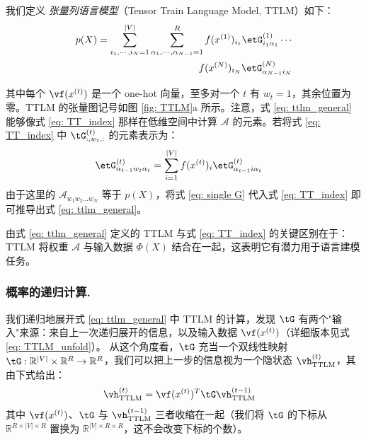 我们定义 \textit{张量列语言模型}（Tensor Train Language Model, TTLM）如下：
\begin{equation}
\begin{split}
    p(X) = \sum_{i_1, \cdots, i_N = 1}^{|V|} \sum_{\alpha_1, \cdots, \alpha_{N-1} = 1}^R f(x^{(1)})_{i_1}\etG^{(1)}_{i_1\alpha_1} \cdots \\ f(x^{(N)})_{i_N}\etG^{(N)}_{\alpha_{N-1}i_N}  \label{eq: ttlm_general}
\end{split}
\end{equation}

其中每个 $\vf(x^{(t)})$ 是一个 one-hot 向量，至多对一个 $t$ 有 $w_t = 1$，其余位置为零。TTLM 的张量图记号如图 \ref{fig: TTLM}a 所示。注意，式 \ref{eq: ttlm_general} 能够像式 \ref{eq: TT_index} 那样在低维空间中计算 $\mathcal{A}$ 的元素。若将式 \ref{eq: TT_index} 中 $\tG^{(t)}_{:, w_t, :}$ 的元素表示为：
%
\begin{align}
    \label{eq: single G}
    \etG^{(t)}_{\alpha_{t-1}w_t\alpha_{t}}
    & = \sum_{{i = 1}}^{|V|} f(x^{(t)})_{i}\etG^{(t)}_{\alpha_{t-1}i\alpha_{t}}
\end{align}
%
由于这里的 $\mathcal{A}_{w_1w_2...w_N}$ 等于 $p(X)$，将式 \ref{eq: single G} 代入式 \ref{eq: TT_index} 即可推导出式 \ref{eq: ttlm_general}。

由式 \ref{eq: ttlm_general} 定义的 TTLM 与式 \ref{eq: TT_index} 的关键区别在于：TTLM 将权重 $\mathcal{A}$ 与输入数据 $\Phi(X)$ 结合在一起，这表明它有潜力用于语言建模任务。

\subsubsection{概率的递归计算.}
\label{sec:recursive probability}
我们递归地展开式 \ref{eq: ttlm_general} 中 TTLM 的计算，发现 $\tG$ 有两个"输入"来源：来自上一次递归展开的信息，以及输入数据 $\vf(x^{(t)})$（详细版本见式 \ref{eq: TTLM_unfold}）。
从这个角度看，$\tG$ 充当一个双线性映射 $\tG: \mathbb{R}^{|V|} \times \mathbb{R}^R \rightarrow \mathbb{R}^R $，我们可以把上一步的信息视为一个隐状态 $\vh^{(t)}_\text{TTLM}$，其由下式给出：
%
\begin{align}
    \label{eq: ttlm cell full}
    \vh^{(t)}_{\textrm{TTLM}}
    & = \vf(x^{(t)})^T\tG  \vh^{(t-1)}_{\textrm{TTLM}}
\end{align}
%
其中 $\vf(x^{(t)})$、$\tG$ 与 $\vh^{(t-1)}_{\textrm{TTLM}}$ 三者收缩在一起（我们将 $\tG$ 的下标从 $\mathbb{R}^{R \times |V| \times R}$ 置换为 $\mathbb{R}^{|V| \times R \times R}$，这不会改变下标的个数）。

